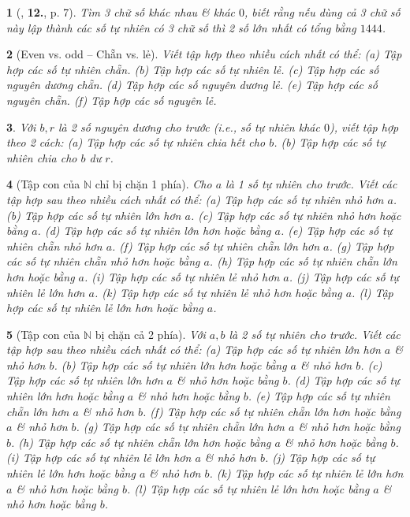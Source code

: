 \documentclass{article}
\newtheorem{baitoan}{}
\begin{document}
\begin{baitoan}[\cite{Binh_Toan_6_tap_1}, \textbf{12.}, p. 7]
	Tìm 3 chữ số khác nhau \& khác $0$, biết rằng nếu dùng cả 3 chữ số này lập thành các số tự nhiên có 3 chữ số thì 2 số lớn nhất có tổng bằng $1444$.
\end{baitoan}

\begin{baitoan}[Even vs. odd -- Chẵn vs. lẻ]
	Viết tập hợp theo nhiều cách nhất có thể: (a) Tập hợp các số tự nhiên chẵn. (b) Tập hợp các số tự nhiên lẻ. (c) Tập hợp các số nguyên dương chẵn. (d) Tập hợp các số nguyên dương lẻ. (e) Tập hợp các số nguyên chẵn. (f) Tập hợp các số nguyên lẻ.
\end{baitoan}

\begin{baitoan}
	Với $b,r$ là 2 số nguyên dương cho trước (i.e., số tự nhiên khác $0$), viết tập hợp theo 2 cách: (a) Tập hợp các số tự nhiên chia hết cho $b$. (b) Tập hợp các số tự nhiên chia cho $b$ dư $r$.
\end{baitoan}

\begin{baitoan}[Tập con của $\mathbb{N}$ chỉ bị chặn 1 phía]
	Cho $a$ là 1 số tự nhiên cho trước. Viết các tập hợp sau theo nhiều cách nhất có thể: (a) Tập hợp các số tự nhiên nhỏ hơn $a$. (b) Tập hợp các số tự nhiên lớn hơn $a$. (c) Tập hợp các số tự nhiên nhỏ hơn hoặc bằng $a$. (d) Tập hợp các số tự nhiên lớn hơn hoặc bằng $a$. (e) Tập hợp các số tự nhiên chẵn nhỏ hơn $a$. (f) Tập hợp các số tự nhiên chẵn lớn hơn $a$. (g) Tập hợp các số tự nhiên chẵn nhỏ hơn hoặc bằng $a$. (h) Tập hợp các số tự nhiên chẵn lớn hơn hoặc bằng $a$. (i) Tập hợp các số tự nhiên lẻ nhỏ hơn $a$. (j) Tập hợp các số tự nhiên lẻ lớn hơn $a$. (k) Tập hợp các số tự nhiên lẻ nhỏ hơn hoặc bằng $a$. (l) Tập hợp các số tự nhiên lẻ lớn hơn hoặc bằng $a$.
\end{baitoan}

\begin{baitoan}[Tập con của $\mathbb{N}$ bị chặn cả 2 phía]
	Với $a,b$ là 2 số tự nhiên cho trước. Viết các tập hợp sau theo nhiều cách nhất có thể: (a) Tập hợp các số tự nhiên lớn hơn $a$ \& nhỏ hơn $b$. (b) Tập hợp các số tự nhiên lớn hơn hoặc bằng $a$ \& nhỏ hơn $b$. (c) Tập hợp các số tự nhiên lớn hơn $a$ \& nhỏ hơn hoặc bằng $b$. (d) Tập hợp các số tự nhiên lớn hơn hoặc bằng $a$ \& nhỏ hơn hoặc bằng $b$. (e) Tập hợp các số tự nhiên chẵn lớn hơn $a$ \& nhỏ hơn $b$. (f) Tập hợp các số tự nhiên chẵn lớn hơn hoặc bằng $a$ \& nhỏ hơn $b$. (g) Tập hợp các số tự nhiên chẵn lớn hơn $a$ \& nhỏ hơn hoặc bằng $b$. (h) Tập hợp các số tự nhiên chẵn lớn hơn hoặc bằng $a$ \& nhỏ hơn hoặc bằng $b$. (i) Tập hợp các số tự nhiên lẻ lớn hơn $a$ \& nhỏ hơn $b$. (j) Tập hợp các số tự nhiên lẻ lớn hơn hoặc bằng $a$ \& nhỏ hơn $b$. (k) Tập hợp các số tự nhiên lẻ lớn hơn $a$ \& nhỏ hơn hoặc bằng $b$. (l) Tập hợp các số tự nhiên lẻ lớn hơn hoặc bằng $a$ \& nhỏ hơn hoặc bằng $b$.
\end{baitoan}
\end{document}

